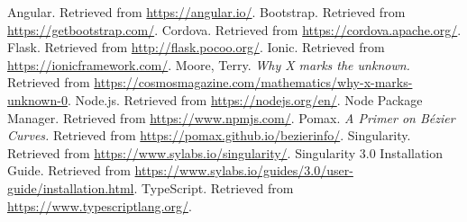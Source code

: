 \documentclass[12pt]{report}
\begin{document}
\begin{thebibliography}{9}
     Angular. Retrieved from \url{https://angular.io/}.
     Bootstrap. Retrieved from
        \url{https://getbootstrap.com/}.
     Cordova. Retrieved from \url{https://cordova.apache.org/}.
     Flask. Retrieved from \url{http://flask.pocoo.org/}.
     Ionic. Retrieved from \url{https://ionicframework.com/}.
     Moore, Terry. \textit{Why X marks the unknown.} Retrieved
        from \url{https://cosmosmagazine.com/mathematics/why-x-marks-unknown-0}.
     Node\@.js. Retrieved from \url{https://nodejs.org/en/}.
     Node Package Manager. Retrieved from \url{https://www.npmjs.com/}.
     Pomax. \textit{A Primer on Bézier Curves.} Retrieved from
        \url{https://pomax.github.io/bezierinfo/}.
     Singularity. Retrieved from \url{https://www.sylabs.io/singularity/}.
     Singularity 3\@.0 Installation Guide. Retrieved
        from
        \url{https://www.sylabs.io/guides/3.0/user-guide/installation.html}.
     TypeScript. Retrieved from
        \url{https://www.typescriptlang.org/}.
\end{thebibliography}
\end{document}
